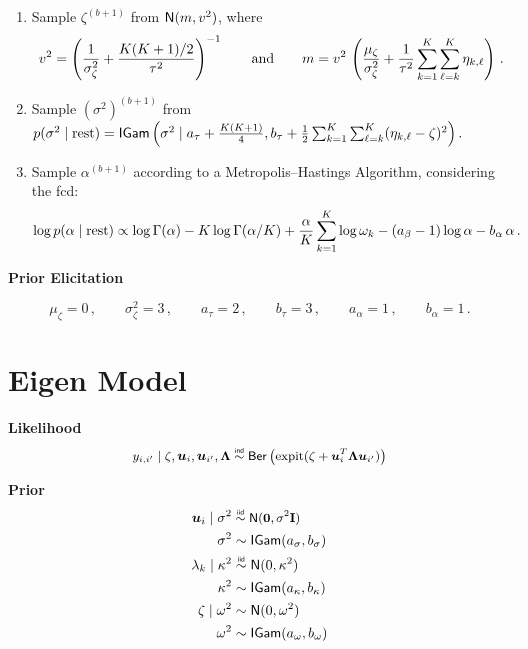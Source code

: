 \documentclass[letterpaper,12pt,openany]{article}
\def\frac#1#2{{{#1}\over{#2}}}
\def\le{\left}
\def\ri{\right}
\DeclareMathOperator*{\expit}{expit}
\newcommand\simiid{\mathrel{\overset{\makebox[0pt]{\mbox{\normalfont\tiny\sffamily iid}}}{\sim}}}
\newcommand\simind{\mathrel{\overset{\makebox[0pt]{\mbox{\normalfont\tiny\sffamily ind}}}{\sim}}}
\def\Ber{\small{\mathsf{Ber}}}
\def\Nor{\small{\mathsf{N}}}
\def\IGamd{\small{\mathsf{IGam}}}
\def\rest{\text{rest}}
\def\I{\mathbf{I}}\def\i{\mathbf{i}}\def\Iv{\boldsymbol{I}}\def\iv{\boldsymbol{i}}
\def\al{\alpha}\def\alv{\boldsymbol{\alpha}}
\def\si{\sigma}\def\siv{\boldsymbol{\sigma}}
\def\sig{\sigma}\def\sigv{\boldsymbol{\sigma}}
\def\ome{\omega}
\def\kap{\kappa}
\def\zerov{\boldsymbol{0}}
\begin{document}
\begin{enumerate}
	\item Sample $\zeta^{(b+1)}$ from $\Nor(m,v^2)$, where
	$$v^2 = \left(\frac{1}{\sigma^2_\zeta} + \frac{K(K+1)/2}{\tau^2}\right)^{-1} \qquad\text{and}\qquad m =	v^2\,\left( \frac{\mu_\zeta}{\sigma^2_\zeta} + \frac{1}{\tau^2}\sum_{k=1}^K\sum_{\ell=k}^K\eta_{k,\ell} \right)\,.$$
	
	\item Sample $(\si^2)^{(b+1)}$ from
	$p(\sig^2\mid\rest) = \IGamd\le(\sig^2 \mid a_\tau + \tfrac{K(K+1)}4, b_\tau + \tfrac12\sum_{k=1}^K\sum_{\ell=k}^K (\eta_{k,\ell}-\zeta)^2  \ri).$
	
	\item Sample $\alpha^{(b+1)}$ according to a Metropolis--Hastings Algorithm, considering the fcd:
	\begin{align*}
	\log p(\alpha\mid\rest)
	&\propto
	\log\Gamma(\alpha) - K\log\Gamma(\alpha/K) + \frac{\al}{K}\sum_{k=1}^K\log\omega_k - (a_\beta-1)\log\al - b_\al\,\al\,.
	\end{align*}
	
\end{enumerate}

\textbf{Prior Elicitation}

$$
\mu_\zeta = 0\,,\qquad\sig_\zeta^2=3\,,\qquad a_\tau=2\,,\qquad b_\tau = 3 \,,\qquad a_\al=1\,,\qquad b_\al = 1\,.
$$

\section{Eigen Model}

\textbf{Likelihood}
$$
\begin{aligned}
y_{i,i'}\mid\zeta,\uv_{i},\uv_{i'}, \LAM \simind \Ber\left( \expit(\zeta + \uv_{i}^T \LAM \uv_{i'} ) \right) 
\end{aligned}
$$

\textbf{Prior}
$$
\begin{aligned}
\uv_{i}\mid\sigma^2 & \simiid \Nor(\zerov,\sig^2\I) \\
\sigma^2            & \sim    \IGamd(a_{\sig}, b_{\sig}) \\
\lambda_k\mid\kap^2 & \simiid \Nor(0,\kap^2)        \\
\kappa^2            & \sim    \IGamd(a_{\kap}, b_{\kap}) \\
\zeta\mid \ome^2    & \sim    \Nor(0,\ome^2)        \\
\ome^2              & \sim    \IGamd(a_{\ome}, b_{\ome})
\end{aligned}
$$
\end{document}
